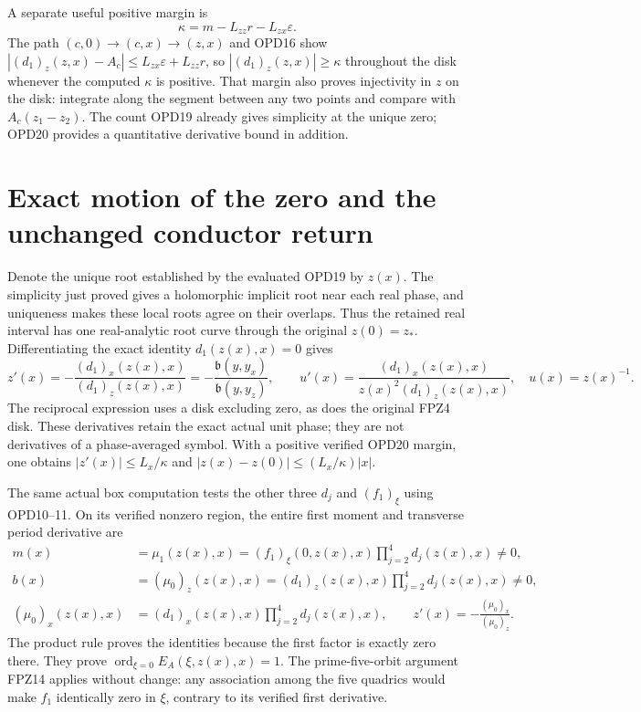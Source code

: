 \documentclass[11pt]{article}
\newcommand{\ord}{\operatorname{ord}}
\begin{document}
A separate useful positive margin is
\[
 \kappa=m-L_{zz}r-L_{zx}\varepsilon.
 \tag{OPD20}
\]
The path $(c,0)\to(c,x)\to(z,x)$ and OPD16 show
$|(d_1)_z(z,x)-A_c|\le L_{zx}\varepsilon+L_{zz}r$,
so $|(d_1)_z(z,x)|\ge\kappa$ throughout the disk whenever
the computed $\kappa$ is positive. That margin also proves
injectivity in $z$ on the disk: integrate along the segment
between any two points and compare with $A_c(z_1-z_2)$.
The count OPD19 already gives simplicity at the unique zero;
OPD20 provides a quantitative derivative bound in addition.

\section{Exact motion of the zero and the unchanged conductor return}
Denote the unique root established by the evaluated OPD19 by $z(x)$.
The simplicity just proved gives a holomorphic implicit root near
each real phase, and uniqueness makes these local roots agree on
their overlaps. Thus the retained real interval has one real-analytic
root curve through the original $z(0)=z_*$. Differentiating the
exact identity $d_1(z(x),x)=0$ gives
\[
 z'(x)=-\frac{(d_1)_x(z(x),x)}{(d_1)_z(z(x),x)}
      =-\frac{\mathfrak b(y,y_x)}{\mathfrak b(y,y_z)},\qquad
 u'(x)=\frac{(d_1)_x(z(x),x)}{z(x)^2(d_1)_z(z(x),x)},
 \quad u(x)=z(x)^{-1}.
 \tag{OPD21}
\]
The reciprocal expression uses a disk excluding zero, as does
the original FPZ4 disk. These derivatives retain the exact actual
unit phase; they are not derivatives of a phase-averaged symbol.
With a positive verified OPD20 margin, one obtains
$|z'(x)|\le L_x/\kappa$ and
$|z(x)-z(0)|\le (L_x/\kappa)|x|$.

The same actual box computation tests the other three $d_j$ and
$(f_1)_\xi$ using OPD10--11. On its verified nonzero region,
the entire first moment and transverse period derivative are
\[
 \begin{split}
 m(x)&=\mu_1(z(x),x)
 =(f_1)_\xi(0,z(x),x)\prod_{j=2}^4d_j(z(x),x)\ne0,\\
 b(x)&=(\mu_0)_z(z(x),x)
 =(d_1)_z(z(x),x)\prod_{j=2}^4d_j(z(x),x)\ne0,\\
 (\mu_0)_x(z(x),x)&=(d_1)_x(z(x),x)
                        \prod_{j=2}^4d_j(z(x),x),\qquad
 z'(x)=-\frac{(\mu_0)_x}{(\mu_0)_z}.
 \end{split}\tag{OPD22}
\]
The product rule proves the identities because the first factor is
exactly zero there. They prove $\ord_{\xi=0}E_A(\xi,z(x),x)=1$.
The prime-five-orbit argument FPZ14 applies without change: any
association among the five quadrics would make $f_1$ identically
zero in $\xi$, contrary to its verified first derivative.
\end{document}
